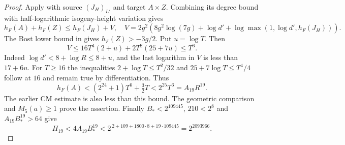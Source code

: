 \documentclass[11pt]{article}
\theoremstyle{definition}
\theoremstyle{remark}
\begin{document}
\begin{proof}
Apply \cite[Theorem~1.9(1), pp.~7--8]{GaudronRemond2023} with source
$(J_H)_{L'}$ and target $A\times Z$. Combining its degree bound with
half-logarithmic isogeny-height variation gives
\[
 h_F(A)+h_F(Z)\le h_F(J_H)+V,\quad
 V=2g^2\left(8g^2\log(7g)+\log d'
     +\log\max(1,\log d',h_F(J_H))\right).
\]
The Bost lower bound in \cite[(2.2), p.~5]{vonKaenel2021} gives
$h_F(Z)>-3g/2$. Put $u=\log T$. Then
\[
 V\le16T^4(2+u)+2T^2(25+7u)\le T^6.
\]
Indeed $\log d'<8+\log R\le8+u$, and the last logarithm in $V$ is
less than $17+6u$. For $T\ge16$ the inequalities
$2+\log T\le T^2/32$ and $25+7\log T\le T^4/4$ follow at $16$
and remain true by differentiation. Thus
\[
 h_F(A)<(2^{24}+1)T^6+\tfrac32T
       <2^{25}T^6=A_{19}R^{19}.
\]
The earlier CM estimate is also less than this bound.
The geometric comparison and $M_5(a)\ge1$ prove the assertion.
Finally $B_*<2^{109445}$, $210<2^8$ and $A_{19}B_*^{19}>64$ give
\[
 H_{19}<4A_{19}B_*^{19}
       <2^{\,2+109+1800\cdot8+19\cdot109445}
       =2^{2093966}.
\]
\end{proof}
\end{document}
